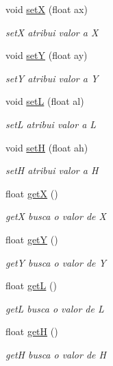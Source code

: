 \begin{DoxyCompactItemize}
\item 
void \hyperlink{classRetangulo_ae8f1addf1aa58db6bb7ecdacf24cf8b5}{setX} (float ax)
\begin{DoxyCompactList}\small\item\em setX atribui valor a X \end{DoxyCompactList}\item 
void \hyperlink{classRetangulo_a33dc14f360717587910402086d0e41ec}{setY} (float ay)
\begin{DoxyCompactList}\small\item\em setY atribui valor a Y \end{DoxyCompactList}\item 
void \hyperlink{classRetangulo_a5c3c6a3b23021c98fa59d8e33ae98f5d}{setL} (float al)
\begin{DoxyCompactList}\small\item\em setL atribui valor a L \end{DoxyCompactList}\item 
void \hyperlink{classRetangulo_a873a695a170f2101e5b2318096a5b132}{setH} (float ah)
\begin{DoxyCompactList}\small\item\em setH atribui valor a H \end{DoxyCompactList}\item 
float \hyperlink{classRetangulo_ab75dcae43c0c9b632843b2085f8bd118}{getX} ()
\begin{DoxyCompactList}\small\item\em getX busca o valor de X \end{DoxyCompactList}\item 
float \hyperlink{classRetangulo_a2e0095a7ac3e17c4e18cef6802618206}{getY} ()
\begin{DoxyCompactList}\small\item\em getY busca o valor de Y \end{DoxyCompactList}\item 
float \hyperlink{classRetangulo_a1b470847bf9d2eb82697cfd720d85f31}{getL} ()
\begin{DoxyCompactList}\small\item\em getL busca o valor de L \end{DoxyCompactList}\item 
float \hyperlink{classRetangulo_a7173c6d2b99f52f4da5d7e81fbbb07fe}{getH} ()
\begin{DoxyCompactList}\small\item\em getH busca o valor de H \end{DoxyCompactList}\end{DoxyCompactItemize}


